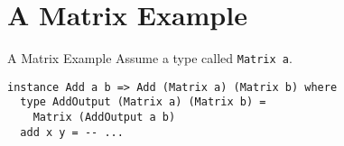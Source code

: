 \documentclass[
  english,            %
  aspectratio=169,    %
]{tumbeamer}
\begin{document}
\section{A Matrix Example}

\begin{frame}[fragile]{A Matrix Example}
Assume a type called \texttt{Matrix a}.

\pause \vspace{3mm}

\begin{verbatim}
instance Add a b => Add (Matrix a) (Matrix b) where
  type AddOutput (Matrix a) (Matrix b) =
    Matrix (AddOutput a b)
  add x y = -- ...
\end{verbatim}
\end{frame}
\end{document}

